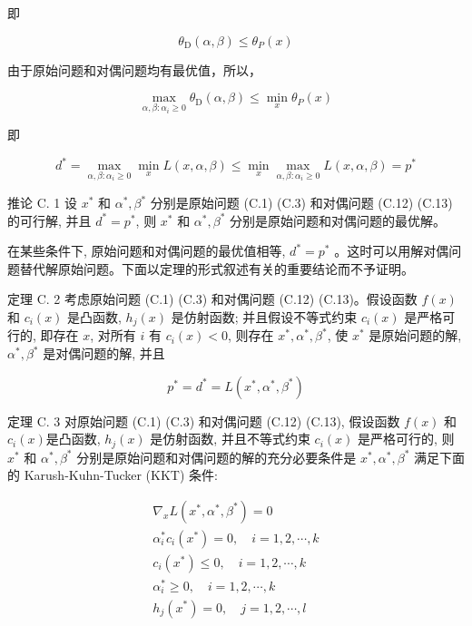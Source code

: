 \documentclass[10pt]{article}
\begin{document}
即


\begin{equation*}
\theta_{\mathrm{D}}(\alpha, \beta) \leqslant \theta_{P}(x) \tag{C.17}
\end{equation*}


由于原始问题和对偶问题均有最优值，所以，


\begin{equation*}
\max _{\alpha, \beta: \alpha_{i} \geqslant 0} \theta_{\mathrm{D}}(\alpha, \beta) \leqslant \min _{x} \theta_{P}(x) \tag{C.18}
\end{equation*}


即


\begin{equation*}
d^{*}=\max _{\alpha, \beta: \alpha_{i} \geqslant 0} \min _{x} L(x, \alpha, \beta) \leqslant \min _{x} \max _{\alpha, \beta: \alpha_{i} \geqslant 0} L(x, \alpha, \beta)=p^{*} \tag{C.19}
\end{equation*}


推论 C. 1 设 $x^{*}$ 和 $\alpha^{*}, \beta^{*}$ 分别是原始问题 (C.1) (C.3) 和对偶问题 (C.12) (C.13) 的可行解, 并且 $d^{*}=p^{*}$, 则 $x^{*}$ 和 $\alpha^{*}, \beta^{*}$ 分别是原始问题和对偶问题的最优解。

在某些条件下, 原始问题和对偶问题的最优值相等, $d^{*}=p^{*}$ 。这时可以用解对偶问题替代解原始问题。下面以定理的形式叙述有关的重要结论而不予证明。

定理 C. 2 考虑原始问题 (C.1) (C.3) 和对偶问题 (C.12) (C.13)。假设函数 $f(x)$ 和 $c_{i}(x)$ 是凸函数, $h_{j}(x)$ 是仿射函数; 并且假设不等式约束 $c_{i}(x)$ 是严格可行的, 即存在 $x$, 对所有 $i$ 有 $c_{i}(x)<0$, 则存在 $x^{*}, \alpha^{*}, \beta^{*}$, 使 $x^{*}$ 是原始问题的解, $\alpha^{*}, \beta^{*}$ 是对偶问题的解, 并且


\begin{equation*}
p^{*}=d^{*}=L\left(x^{*}, \alpha^{*}, \beta^{*}\right) \tag{C.20}
\end{equation*}


定理 C. 3 对原始问题 (C.1) (C.3) 和对偶问题 (C.12) (C.13), 假设函数 $f(x)$ 和 $c_{i}(x)$是凸函数, $h_{j}(x)$ 是仿射函数, 并且不等式约束 $c_{i}(x)$ 是严格可行的, 则 $x^{*}$ 和 $\alpha^{*}, \beta^{*}$ 分别是原始问题和对偶问题的解的充分必要条件是 $x^{*}, \alpha^{*}, \beta^{*}$ 满足下面的 Karush-Kuhn-Tucker (KKT) 条件:


\begin{gather*}
\nabla_{x} L\left(x^{*}, \alpha^{*}, \beta^{*}\right)=0  \tag{C.21}\\
\alpha_{i}^{*} c_{i}\left(x^{*}\right)=0, \quad i=1,2, \cdots, k  \tag{C.22}\\
c_{i}\left(x^{*}\right) \leqslant 0, \quad i=1,2, \cdots, k  \tag{C.23}\\
\alpha_{i}^{*} \geqslant 0, \quad i=1,2, \cdots, k  \tag{C.24}\\
h_{j}\left(x^{*}\right)=0, \quad j=1,2, \cdots, l \tag{C.25}
\end{gather*}
\end{document}
